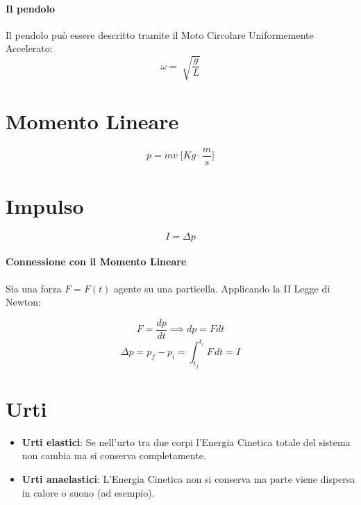         \paragraph{Il pendolo} Il pendolo può essere descritto tramite il
        Moto Circolare Uniformemente Accelerato:
        \begin{equation*}
            \omega = \sqrt[]{\frac{g}{L}}
        \end{equation*}
    
\newpage
    
    \section*{Momento Lineare}
        \begin{equation*}
            p = mv \; \Bigg[Kg \cdot \frac{m}{s}\Bigg] 
        \end{equation*}

    \section*{Impulso}
        \begin{equation*}
            I = \Delta p
        \end{equation*}

        \paragraph{Connessione con il Momento Lineare} Sia una forza $F = F(t)$
        agente su una particella. Applicando la II Legge di Newton:

        \begin{equation*}
            F = \frac{dp}{dt} \implies dp = F dt
        \end{equation*}
        \begin{equation*}
            \Delta p = p_f - p_i = \int_{t_f}^{t_i} F \,dt = I 
        \end{equation*}
    
    \section*{Urti}
    \begin{itemize}
        \item \textbf{Urti elastici}: Se nell'urto tra due corpi l'Energia 
        Cinetica totale del sistema non cambia ma si conserva completamente.
        \item \textbf{Urti anaelastici}: L'Energia Cinetica non si conserva ma 
        parte viene dispersa in calore o suono (ad esempio).
    \end{itemize} 

